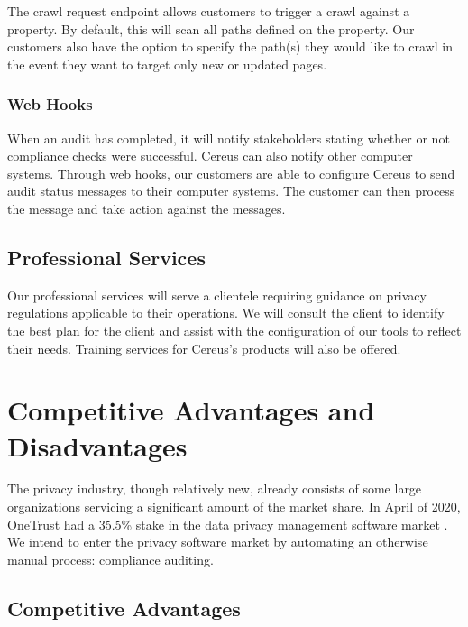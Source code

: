 The crawl request endpoint allows customers to trigger a crawl against a property. By default, this will scan all paths defined on the property. Our customers also have the option to specify the path(s) they would like to crawl in the event they want to target only new or updated pages.

\subsubsection*{Web Hooks}

When an audit has completed, it will notify stakeholders stating whether or not compliance checks were successful. Cereus can also notify other computer systems. Through web hooks, our customers are able to configure Cereus to send audit status messages to their computer systems. The customer can then process the message and take action against the messages.

\subsection{Professional Services}

Our professional services will serve a clientele requiring guidance on privacy regulations applicable to their operations. We will consult the client to identify the best plan for the client and assist with the configuration of our tools to reflect their needs. Training services for Cereus's products will also be offered.

\section{Competitive Advantages and Disadvantages}

The privacy industry, though relatively new, already consists of some large organizations servicing a significant amount of the market share. In April of 2020, OneTrust had a 35.5\% stake in the data privacy management software market \cite{onetrust.2020}. We intend to enter the privacy software market by automating an otherwise manual process: compliance auditing.

\subsection{Competitive Advantages}

